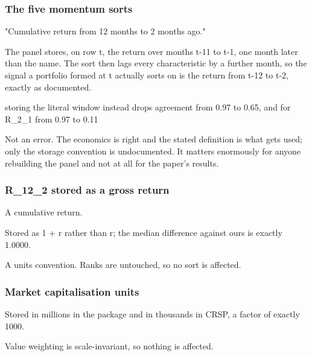 \documentclass[11pt]{article}
\begin{document}
\subsubsection*{The five momentum sorts}
\begin{description}[leftmargin=2.4cm,labelwidth=2.2cm,font=\normalfont\bfseries,style=sameline]
\item[Documented:] "Cumulative return from 12 months to 2 months ago."
\item[Implemented:] The panel stores, on row t, the return over months t-11 to t-1, one month later than the name. The sort then lags every characteristic by a further month, so the signal a portfolio formed at t actually sorts on is the return from t-12 to t-2, exactly as documented.
\item[Evidence:] storing the literal window instead drops agreement from 0.97 to 0.65, and for R\_2\_1 from 0.97 to 0.11
\item[Why it matters:] Not an error. The economics is right and the stated definition is what gets used; only the storage convention is undocumented. It matters enormously for anyone rebuilding the panel and not at all for the paper's results.
\end{description}
\subsubsection*{R\_12\_2 stored as a gross return}
\begin{description}[leftmargin=2.4cm,labelwidth=2.2cm,font=\normalfont\bfseries,style=sameline]
\item[Documented:] A cumulative return.
\item[Implemented:] Stored as 1 + r rather than r; the median difference against ours is exactly 1.0000.
\item[Why it matters:] A units convention. Ranks are untouched, so no sort is affected.
\end{description}
\subsubsection*{Market capitalisation units}
\begin{description}[leftmargin=2.4cm,labelwidth=2.2cm,font=\normalfont\bfseries,style=sameline]
\item[Implemented:] Stored in millions in the package and in thousands in CRSP, a factor of exactly 1000.
\item[Why it matters:] Value weighting is scale-invariant, so nothing is affected.
\end{description}
\end{document}
